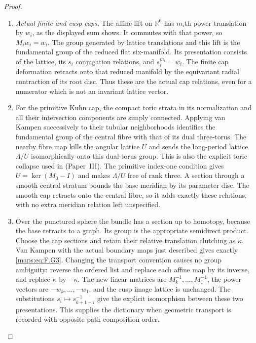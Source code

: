 \documentclass[11pt,a4paper]{article}
\theoremstyle{definition}
\newcommand{\ExternalPaperRef}[3]{\ifmmode\text{\upshape #1#2 (Paper~#3)}\else #1#2 (Paper~#3)\fi}
\begin{document}
\begin{proof}
\begin{enumerate}[label=\arabic*.]
\item \emph{Actual finite and cusp caps.}
The affine lift on $\mathbb R^6$ has $m_i$th power translation by
$w_i$, as the displayed sum shows.  It commutes with that power,
so $M_iw_i=w_i$.  The group generated by lattice translations
and this lift is the fundamental group of the reduced flat
six-manifold.  Its presentation consists of the lattice, its
$s_i$ conjugation relations, and $s_i^{m_i}=w_i$.
The finite cap deformation retracts onto that reduced manifold
by the equivariant radial contraction of its root disc.
Thus these are the actual cap relations, even for a numerator
which is not an invariant lattice vector.

\item For the primitive Kuhn cap, the compact toric strata in its
normalization and all their intersection components are simply
connected.  Applying van Kampen successively to their tubular
neighborhoods identifies the fundamental group of the central
fibre with that of its dual three-torus.  The nearby fibre map
kills the angular lattice $U$ and sends the long-period lattice
$\Lambda/U$ isomorphically onto this dual-torus group.  This is
also the explicit toric collapse used in \ExternalPaperRef{}{6.3}{III}.  The primitive
index-one condition gives $U=\ker(M_0-I)$ and makes $\Lambda/U$
free of rank three.  A section through a smooth central stratum
bounds the base meridian by its parameter disc.  The smooth cap
retracts onto the central fibre, so it adds exactly these
relations, with no extra meridian relation left unspecified.

\item Over the punctured sphere the bundle has a section up to homotopy,
because the base retracts to a graph.  Its group is the appropriate
semidirect product.  Choose the cap sections and retain their
relative translation clutching as $\kappa$.  Van Kampen with the
actual boundary maps just described gives exactly \eqref{maps:eq:F.G3}.
Changing the transport convention causes no group ambiguity:
reverse the ordered list and replace each affine map by its
inverse, and replace $\kappa$ by $-\kappa$.  The new linear
matrices are $M_k^{-1},\ldots,M_1^{-1}$, the power vectors are
$-w_k,\ldots,-w_1$, and the cusp image lattice is unchanged.
The substitutions $s_i\mapsto s_{k+1-i}^{-1}$ give the explicit
isomorphism between these two presentations.  This supplies the
dictionary when geometric transport is recorded with opposite
path-composition order.


\end{enumerate}
\end{proof}
\end{document}
